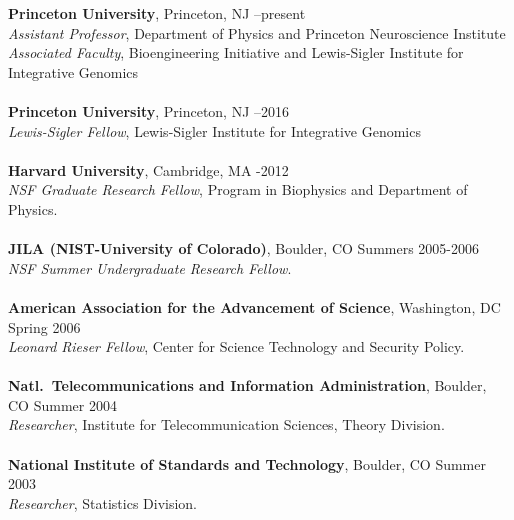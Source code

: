 \documentclass[11pt]{article}
\makeatletter
\renewcommand{\section}{\@startsection
{section}%
{1}%
{0mm}%
{2\baselineskip}%
{0.5\baselineskip}%
{\normalfont\bf\MakeUppercase}} %
\makeatother
\begin{document}
{\bf Princeton University}, Princeton, NJ  --present\\
{\it Assistant Professor}, Department of Physics and Princeton
Neuroscience Institute \\
{\it Associated Faculty}, Bioengineering Initiative and Lewis-Sigler Institute for Integrative Genomics \\
\\
{\bf Princeton University}, Princeton, NJ  --2016\\
{\it Lewis-Sigler Fellow}, Lewis-Sigler Institute for Integrative Genomics\\ 
\\
{\bf Harvard University}, 
Cambridge, MA  -2012\\
{\it NSF Graduate Research Fellow}, Program in Biophysics and Department of Physics.\\
\\
{\bf JILA (NIST-University of Colorado)}, Boulder, CO   \dotfill Summers 2005-2006\\
{\it NSF Summer Undergraduate Research Fellow}.\\
\\
{\bf American Association for the Advancement of Science}, Washington, DC  \dotfill Spring 2006\\
{\it Leonard Rieser Fellow}, Center for Science Technology and Security Policy.\\
\\
{\bf Natl.~Telecommunications and Information Administration}, Boulder, CO  \dotfill Summer 2004\\
{\it Researcher}, Institute for Telecommunication Sciences, Theory Division.\\
\\
{\bf National Institute of Standards and Technology}, Boulder, CO  \dotfill Summer 2003\\
{\it Researcher}, Statistics Division.\\
\end{document}
